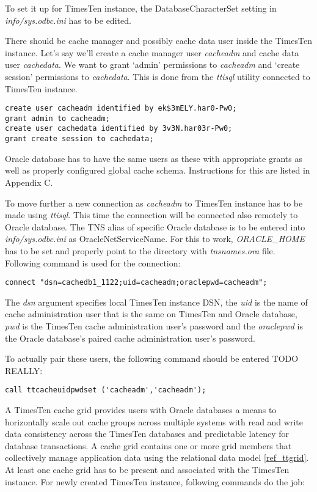 \documentclass[11pt, letterpaper]{article}
\begin{document}
To set it up for TimesTen instance, the DatabaseCharacterSet setting in \emph{info/sys.odbc.ini} has to be edited.

There should be cache manager and possibly cache data user inside the TimesTen instance. Let’s say we’ll create a cache manager user \emph{cacheadm} and cache data user \emph{cachedata}. We want to grant ‘admin’ permissions to \emph{cacheadm} and ‘create session’ permissions to \emph{cachedata}. This is done from the \emph{ttisql} utility connected to TimesTen instance.

\begin{lstlisting}
create user cacheadm identified by ek$3mELY.har0-Pw0; 
grant admin to cacheadm;
create user cachedata identified by 3v3N.har03r-Pw0; 
grant create session to cachedata;
\end{lstlisting}

Oracle database has to have the same users as these with appropriate grants as well as properly configured global cache schema. Instructions for this are listed in Appendix C.

To move further a new connection as \emph{cacheadm} to TimesTen instance has to be made using \emph{ttisql}. This time the connection will be connected also remotely to Oracle database. The TNS alias of specific Oracle database is to be entered into \emph{info/sys.odbc.ini} as OracleNetServiceName. For this to work, \emph{ORACLE\_HOME} has to be set and properly point to the directory with \emph{tnsnames.ora} file. Following command is used for the connection:

\begin{lstlisting}
connect "dsn=cachedb1_1122;uid=cacheadm;oraclepwd=cacheadm";
\end{lstlisting}

The \emph{dsn} argument specifies local TimesTen instance DSN, the \emph{uid} is the name of cache administration user that is the same on TimesTen and Oracle database, \emph{pwd} is the TimesTen cache administration user’s password and the \emph{oraclepwd} is the Oracle database’s paired cache administration user’s password.

To actually pair these users, the following command should be entered TODO REALLY:

\begin{lstlisting}
call ttcacheuidpwdset ('cacheadm','cacheadm');
\end{lstlisting}

A TimesTen cache grid provides users with Oracle databases a means to horizontally scale out cache groups across multiple systems with read and write data consistency across the TimesTen databases and predictable latency for database transactions. A cache grid contains one or more grid members that collectively manage application data using the relational data model \ref{ref_ttgrid}. At least one cache grid has to be present and associated with the TimesTen instance. For newly created TimesTen instance, following commands do the job:
\end{document}

